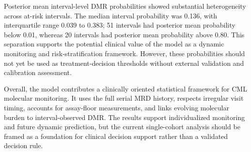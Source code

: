 Posterior mean interval-level DMR probabilities showed substantial heterogeneity across at-risk intervals. The median interval probability was 0.136, with interquartile range 0.039 to 0.383; 51 intervals had posterior mean probability below 0.01, whereas 20 intervals had posterior mean probability above 0.80. This separation supports the potential clinical value of the model as a dynamic monitoring and risk-stratification framework. However, these probabilities should not yet be used as treatment-decision thresholds without external validation and calibration assessment.

Overall, the model contributes a clinically oriented statistical framework for CML molecular monitoring. It uses the full serial MRD history, respects irregular visit timing, accounts for assay-floor measurements, and links evolving molecular burden to interval-observed DMR. The results support individualized monitoring and future dynamic prediction, but the current single-cohort analysis should be framed as a foundation for clinical decision support rather than a validated decision rule.
